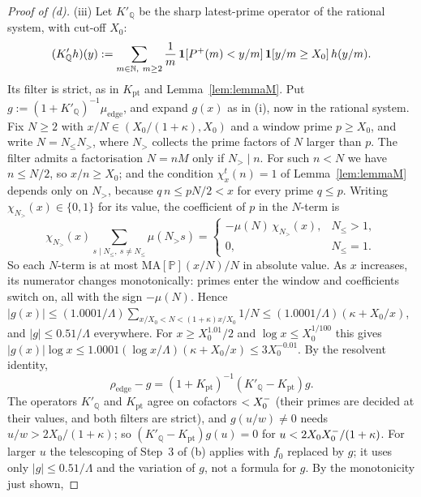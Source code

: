 \begin{proof}[Proof of (d)]
(iii)
Let $K'_{\mathbb Q}$ be the sharp latest-prime operator of the rational system, with cut-off $X_0$:
\[
  (K'_{\mathbb Q}h)(y):=\sum_{m\in\N,\ m\ge2}\frac1m\,\mathbf 1[P^+(m)<y/m]\,\mathbf 1[y/m\ge X_0]\,h(y/m).
\]
Its filter is strict, as in $K_{\mathrm{pt}}$ and Lemma~\ref{lem:lemmaM}. Put $g:=(1+K'_{\mathbb Q})^{-1}\mu_{\mathrm{edge}}$, and expand
$g(x)$ as in (i), now in the rational system.
Fix $N\ge2$ with $x/N\in(X_0/(1+\kappa),X_0)$ and a window prime $p\ge X_0$, and write $N=N_{\le}N_{>}$, where $N_{>}$ collects the
prime factors of $N$ larger than $p$. The filter admits a factorisation $N=nM$ only if $N_{>}\mid n$. For such $n<N$ we have $n\le N/2$,
so $x/n\ge X_0$; and the condition $\chi^t_x(n)=1$ of Lemma~\ref{lem:lemmaM} depends only on $N_{>}$, because $q\,n\le pN/2<x$ for
every prime $q\le p$. Writing $\chi_{N_>}(x)\in\{0,1\}$ for its value, the coefficient of $p$ in the $N$-term is
\[
  \chi_{N_>}(x)\sum_{s\mid N_{\le},\ s\ne N_{\le}}\mu(N_{>}s)=
  \begin{cases}-\mu(N)\,\chi_{N_>}(x),&N_{\le}>1,\\ 0,&N_{\le}=1.\end{cases}
\]
So each $N$-term is at most $\mathrm{MA}[\mathbb P](x/N)/N$ in absolute value. As $x$ increases, its numerator changes monotonically:
primes enter the window and coefficients switch on, all with the sign $-\mu(N)$. Hence
$|g(x)|\le(1.0001/\Lambda)\sum_{x/X_0<N<(1+\kappa)x/X_0}1/N\le(1.0001/\Lambda)(\kappa+X_0/x)$, and $|g|\le0.51/\Lambda$
everywhere. For $x\ge X_0^{1.01}/2$ and $\log x\le X_0^{1/100}$ this gives $|g(x)|\log x\le1.0001(\log x/\Lambda)(\kappa+X_0/x)\le3X_0^{-0.01}$.
By the resolvent identity,
\[
  \rho_{\mathrm{edge}}-g=(1+K_{\mathrm{pt}})^{-1}(K'_{\mathbb Q}-K_{\mathrm{pt}})g .
\]
The operators $K'_{\mathbb Q}$ and $K_{\mathrm{pt}}$ agree on cofactors $<X_0^{-}$ (their primes are decided at their values, and both filters are strict), and $g(u/w)\ne0$ needs $u/w>2X_0/(1+\kappa)$; so
$(K'_{\mathbb Q}-K_{\mathrm{pt}})g(u)=0$ for $u<2X_0X_0^{-}/(1+\kappa)$. For larger $u$ the telescoping of Step~3 of (b) applies with $f_0$
replaced by $g$; it uses only $|g|\le0.51/\Lambda$ and the variation of $g$, not a formula for $g$. By the monotonicity just shown,

\end{proof}
